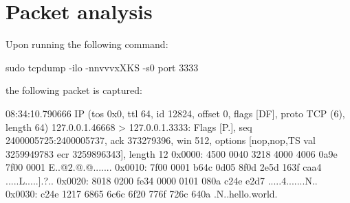 \documentclass{swfulabreport}
\begin{document}
\maketitle %
\clearpage
\section{Packet analysis}

Upon running the following command:

\begin{shcode}
sudo tcpdump -ilo -nnvvvxXKS -s0 port 3333
\end{shcode}

the following packet is captured:

\begin{outputcode}
08:34:10.790666 IP (tos 0x0, ttl 64, id 12824, offset 0, flags [DF],
proto TCP (6), length 64)
  127.0.0.1.46668 > 127.0.0.1.3333: Flags [P.], seq 2400005725:2400005737,
ack 373279396,
  win 512, options [nop,nop,TS val 3259949783 ecr 3259896343], length 12
      0x0000:  4500 0040 3218 4000 4006 0a9e 7f00 0001  E..@2.@.@.......
      0x0010:  7f00 0001 b64c 0d05 8f0d 2e5d 163f caa4  .....L.....].?..
      0x0020:  8018 0200 fe34 0000 0101 080a c24e e2d7  .....4.......N..
      0x0030:  c24e 1217 6865 6c6c 6f20 776f 726c 640a  .N..hello.world.
\end{outputcode}
\end{document}
